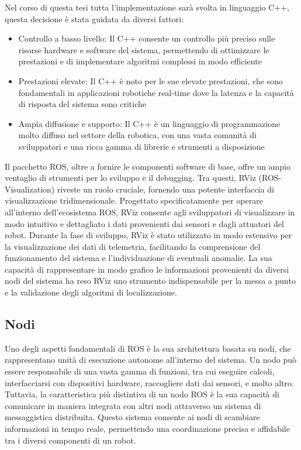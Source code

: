 \noindent Nel corso di questa tesi tutta l'implementazione sarà svolta in linguaggio C++, questa decisione è stata guidata da diversi fattori:

\begin{itemize}
  \item Controllo a basso livello: Il C++ consente un controllo più preciso sulle risorse hardware e software del sistema, permettendo di ottimizzare le prestazioni e di implementare algoritmi complessi in modo efficiente
  \item Prestazioni elevate: Il C++ è noto per le sue elevate prestazioni, che sono fondamentali in applicazioni robotiche real-time dove la latenza e la capacità di risposta del sistema sono critiche
  \item Ampia diffusione e supporto: Il C++ è un linguaggio di programmazione molto diffuso nel settore della robotica, con una vasta comunità di sviluppatori e una ricca gamma di librerie e strumenti a disposizione
\end{itemize}

\noindent Il pacchetto ROS, oltre a fornire le componenti software di base, offre un ampio ventaglio di strumenti per lo sviluppo e il debugging. Tra questi, RViz (ROS-Visualization) riveste un ruolo cruciale, fornendo una potente interfaccia di visualizzazione tridimensionale. Progettato specificatamente per operare all'interno dell'ecosistema ROS, RViz consente agli sviluppatori di visualizzare in modo intuitivo e dettagliato i dati provenienti dai sensori e dagli attuatori del robot. Durante la fase di sviluppo, RViz è stato utilizzato in modo estensivo per la visualizzazione dei dati di telemetria, facilitando la comprensione del funzionamento del sistema e l'individuazione di eventuali anomalie. La sua capacità di rappresentare in modo grafico le informazioni provenienti da diversi nodi del sistema ha reso RViz uno strumento indispensabile per la messa a punto e la validazione degli algoritmi di localizzazione.

\subsection{Nodi}
\noindent Uno degli aspetti fondamentali di ROS è la sua architettura basata su nodi, che rappresentano unità di esecuzione autonome all'interno del sistema. Un nodo può essere responsabile di una vasta gamma di funzioni, tra cui eseguire calcoli, interfacciarsi con dispositivi hardware, raccogliere dati dai sensori, e molto altro. Tuttavia, la caratteristica più distintiva di un nodo ROS è la sua capacità di comunicare in maniera integrata con altri nodi attraverso un sistema di messaggistica distribuita. Questo sistema consente ai nodi di scambiare informazioni in tempo reale, permettendo una coordinazione precisa e affidabile tra i diversi componenti di un robot.

